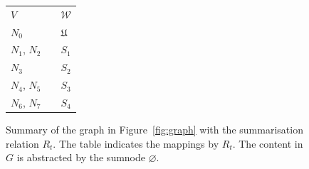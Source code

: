 \begin{figure}
	\centering
	\begin{minipage}{.7\textwidth}
		\resizebox{\textwidth}{!}{
			
		}
	\end{minipage}
	\quad
	\begin{minipage}[h]{.25\textwidth}
		\centering
		\caption*{$R_t\left(V, \mathcal{W}\right)$}
		\begin{tabular}{lc@{\hs}l}
			\toprule
			$V$ & \phantom{a} & $\mathcal{W}$ \\
			\cmidrule{1-1} \cmidrule{3-3}
			$N_0$ & \phantom{a} & $\mathfrak{U}$ \\
			$N_1$, $N_2$ & \phantom{a} & $S_1$ \\
			$N_3$ & \phantom{a} & $S_2$ \\
			$N_4$, $N_5$ & \phantom{a} & $S_3$ \\
			$N_6$, $N_7$ & \phantom{a} & $S_4$ \\
			\bottomrule
		\end{tabular}
	\end{minipage}
	\caption{Summary of the graph in Figure~\ref{fig:graph} with the summarisation relation $R_t$. The table indicates the mappings by $R_t$. The content in $G$ is abstracted by the sumnode $\varnothing$.}
	\label{fig:classes-summary}
\end{figure}

%

